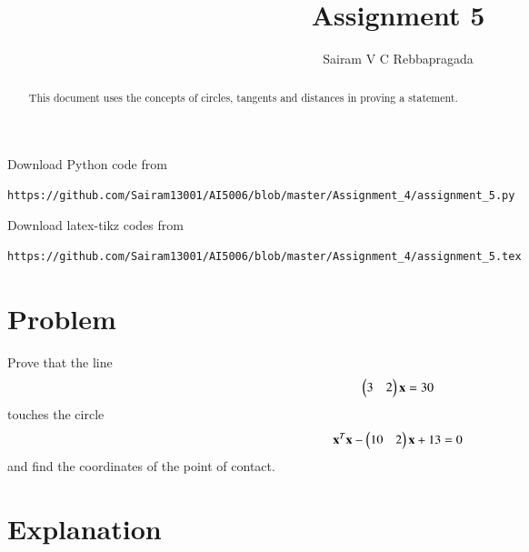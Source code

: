 \documentclass[journal,12pt,twocolumn]{IEEEtran}
\begin{document}
\makeatletter
{}
\makeatother
\let\StandardTheFigure\thefigure
\let\vec\mathbf
\renewcommand{\thefigure}{\theproblem}
\def\putbox#1#2#3{\makebox[0in][l]{\makebox[#1][l]{}\raisebox{\baselineskip}[0in][0in]{\raisebox{#2}[0in][0in]{#3}}}}
     \def\rightbox#1{\makebox[0in][r]{#1}}
     \def\centbox#1{\makebox[0in]{#1}}
     \def\topbox#1{\raisebox{-\baselineskip}[0in][0in]{#1}}
     \def\midbox#1{\raisebox{-0.5\baselineskip}[0in][0in]{#1}}
\vspace{3cm}
\title{Assignment 5}
\author{Sairam V C Rebbapragada}
\maketitle
\newpage
\bigskip
\renewcommand{\thefigure}{\theenumi}
\renewcommand{\thetable}{\theenumi}
\begin{abstract}
This document uses the concepts of circles, tangents and distances in proving a statement.
\end{abstract}
Download Python code from 
%
\begin{lstlisting}
https://github.com/Sairam13001/AI5006/blob/master/Assignment_4/assignment_5.py
\end{lstlisting}
%
Download latex-tikz codes from 
%
\begin{lstlisting}
https://github.com/Sairam13001/AI5006/blob/master/Assignment_4/assignment_5.tex
\end{lstlisting}
%

\section{Problem}
Prove that the line 
\begin{align}
\myvec{3 &2}\vec{x}=30 \label{eq1}
\end{align}
touches the circle
\begin{align}
\vec{x}^T\vec{x}-\myvec{10 & 2}\vec{x}+13 = 0 \label{eq2}
\end{align}
and find the coordinates of the point of contact.

\section{Explanation}
\end{document}
